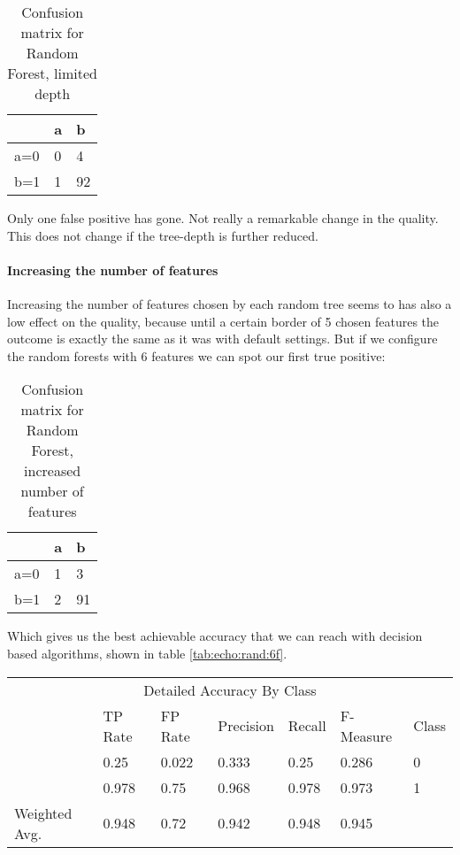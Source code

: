 \documentclass[paper=a4, fontsize=11pt]{scrartcl} %
\numberwithin{equation}{section} %
\numberwithin{figure}{section} %
\numberwithin{table}{section} %
\begin{document}
\begin{table}[h]
\centering
\begin{tabular}{|l|ll|}
\hline
 & a &	b \\
\hline
a=0 & 0 & 4 \\
b=1 & 1 & 92\\
\hline
\end{tabular}
\caption{Confusion matrix for Random Forest, limited depth}
\end{table}

Only one false positive has gone. Not really a remarkable change in the quality. This does not change if the tree-depth is further reduced.

\paragraph{Increasing the number of features}
Increasing the number of features chosen by each random tree seems to has also a low effect on the quality, because until a certain border of 5 chosen features the outcome is exactly the same as it was with default settings. But if we configure the random forests with 6 features we can spot our first true positive:

\begin{table}[h]
\centering
\begin{tabular}{|l|ll|}
\hline
 & a &	b \\
\hline
a=0 & 1 & 3 \\
b=1 & 2 & 91\\
\hline
\end{tabular}
\caption{Confusion matrix for Random Forest, increased number of features}
\end{table}

Which gives us the best achievable accuracy that we can reach with decision based algorithms, shown in table \ref{tab:echo:rand:6f}.
\begin{table*}[htb]\centering
    \begin{tabular*}{\columnwidth}{@{}lllllll@{}}
        \toprule 
        \multicolumn{7}{c}{Detailed Accuracy By Class} \\ 
               &  TP Rate &  FP Rate &  Precision &  Recall &  F-Measure &  Class \\ \midrule
               &  0.25    &  0.022   &  0.333     &  0.25   &  0.286     &  0     \\
               &  0.978   &  0.75    &  0.968     &  0.978  &  0.973     &  1     \\
Weighted Avg.  &  0.948   &  0.72    &  0.942     &  0.948  &  0.945     &        \\ \bottomrule
    \end{tabular*}
\caption{Random Forest -- 6 randomly chosen features} 
\label{tab:echo:rand:6f}
\end{table*}
\FloatBarrier
\end{document}
